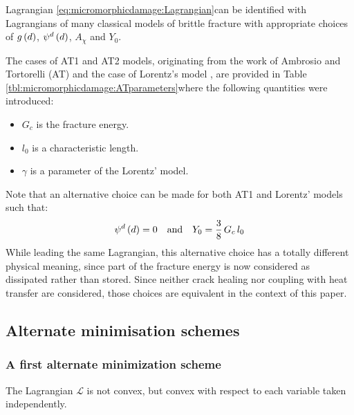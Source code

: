 Lagrangian \eqref{eq:micromorphicdamage:Lagrangian}can be identified with
Lagrangians of many classical models of brittle fracture with
appropriate choices of \(g\left(d\right)\), \({\psi}^{d}\left(d\right)\),
\(A_{\chi}\) and \(Y_{0}\).

The cases of AT1 and AT2 models, originating from the work of Ambrosio
and Tortorelli (AT) \cite{ambrosio_approximation_1990} and the case of
Lorentz's model \cite{lorentz_gradient_2011,lorentz_convergence_2011}, are
provided in Table \ref{tbl:micromorphicdamage:ATparameters}where the
following quantities were introduced:
%
%
%
\begin{itemize}
  \item \(G_{c}\) is the fracture energy.
  \item \(l_{0}\) is a characteristic length.
  \item \(\gamma\) is a parameter of the Lorentz' model.
\end{itemize}


Note that an alternative choice can be made for both AT1 and Lorentz' models such that:
\[
{\psi}^{d}\left(d\right)= 0  \quad\text{and}\quad Y_{0}=\displaystyle \frac{\displaystyle 3}{\displaystyle 8}\,G_{c}\,l_{0}
\]
While leading the same Lagrangian, this alternative choice has a totally
different physical meaning, since part of the fracture energy is now
considered as dissipated rather than stored. Since neither crack healing
nor coupling with heat transfer are considered, those choices are
equivalent in the context of this paper.

\subsection{Alternate minimisation schemes}
\label{sec:micromorphicdamage:alternate_minimisation}

\subsubsection{A first alternate minimization scheme}

The Lagrangian \(\mathcal{L}\) is not convex, but convex with respect to
each variable taken independently.


